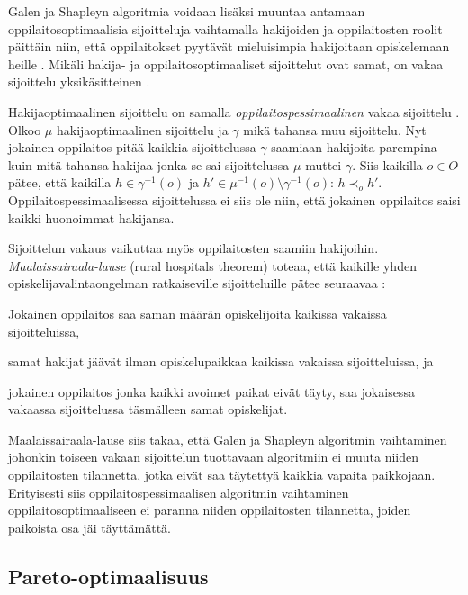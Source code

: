 \documentclass[twoside]{tktltiki}
\begin{document}
Galen ja Shapleyn algoritmia voidaan lisäksi muuntaa antamaan
oppilaitosoptimaalisia sijoitteluja vaihtamalla hakijoiden ja
oppilaitosten roolit päittäin niin, että oppilaitokset pyytävät
mieluisimpia hakijoitaan opiskelemaan heille \cite{galeshapley62}.
Mikäli hakija- ja oppilaitosoptimaaliset sijoittelut ovat samat, on
vakaa sijoittelu yksikäsitteinen \cite{galeshapley62}.

Hakijaoptimaalinen sijoittelu on samalla
\emph{oppilaitospessimaalinen} vakaa sijoittelu \cite{gusfield89}.
Olkoo $\mu$ hakijaoptimaalinen sijoittelu ja $\gamma$ mikä tahansa muu
sijoittelu. Nyt jokainen oppilaitos pitää kaikkia sijoittelussa
$\gamma$ saamiaan hakijoita parempina kuin mitä tahansa hakijaa jonka
se sai sijoittelussa $\mu$ muttei $\gamma$. Siis kaikilla $o \in O$
pätee, että kaikilla $h \in \gamma^{-1}(o)$ ja $h' \in \mu^{-1}(o)
\setminus \gamma^{-1}(o)$: $h \prec_o h'$. Oppilaitospessimaalisessa
sijoittelussa ei siis ole niin, että jokainen oppilaitos saisi kaikki
huonoimmat hakijansa.

Sijoittelun vakaus vaikuttaa myös oppilaitosten saamiin hakijoihin.
\emph{Maalaissairaala-lause} (rural hospitals theorem) toteaa, että
kaikille yhden opiskelijavalintaongelman ratkaiseville sijoitteluille
pätee seuraavaa \cite{gusfield89}:
\newpage
\begin{itemize*}
  \item Jokainen oppilaitos saa saman määrän opiskelijoita kaikissa
    vakaissa sijoitteluissa,
  \item samat hakijat jäävät ilman opiskelupaikkaa kaikissa vakaissa
    sijoitteluissa, ja
  \item jokainen oppilaitos jonka kaikki avoimet paikat eivät täyty,
    saa jokaisessa vakaassa sijoittelussa täsmälleen samat
    opiskelijat.
\end{itemize*}

Maalaissairaala-lause siis takaa, että Galen ja Shapleyn algoritmin
vaihtaminen johonkin toiseen vakaan sijoittelun tuottavaan algoritmiin
ei muuta niiden oppilaitosten tilannetta, jotka eivät saa täytettyä
kaikkia vapaita paikkojaan. Erityisesti siis oppilaitospessimaalisen
algoritmin vaihtaminen oppilaitosoptimaaliseen ei paranna niiden
oppilaitosten tilannetta, joiden paikoista osa jäi täyttämättä.

\subsection{Pareto-optimaalisuus}
\end{document}
